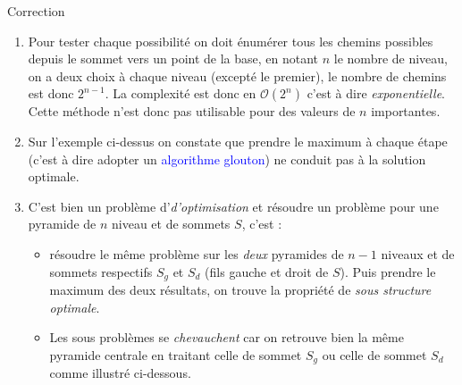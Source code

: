 \documentclass[10pt]{beamer}
\begin{document}
\begin{frame}{\Ctitle}{\stitle}
	\begin{exampleblock}{Correction}
		\addtocounter{enumi}{1}
		\begin{enumerate}
			\item<1->\textcolor{OliveGreen}{\small Pour tester chaque possibilité on doit énumérer tous les chemins possibles depuis le sommet vers un point de la base, en notant $n$ le nombre de niveau, on a deux choix à chaque niveau (excepté le premier), le nombre de chemins est donc $2^{n-1}$. La complexité est donc en $\mathcal{O}(2^n)$ c'est à dire \textit{exponentielle}. Cette méthode n'est donc pas utilisable pour des valeurs de $n$ importantes.}
			\item<2->\textcolor{OliveGreen}{\small Sur l'exemple ci-dessus on constate que prendre le maximum à chaque étape (c'est à dire adopter un \textcolor{blue}{algorithme glouton}) ne conduit pas à la solution optimale.}
			\item<3->\textcolor{OliveGreen}{\small C'est bien un problème d'\textit{d'optimisation} et résoudre un problème pour une pyramide de $n$ niveau et de sommets $S$, c'est :}
			\begin{itemize}
			\item \textcolor{OliveGreen}{\small résoudre le même problème sur  les \textit{deux} pyramides de $n-1$ niveaux et de sommets respectifs $S_g$ et $S_d$ (fils gauche et droit de $S$). Puis prendre le maximum des deux résultats, on trouve la propriété de \textit{sous structure optimale}.}
			\item \textcolor{OliveGreen}{\small Les sous problèmes se \textit{chevauchent} car on retrouve bien la même pyramide centrale en traitant celle de sommet $S_g$ ou celle de sommet $S_d$ comme illustré ci-dessous.}
			\end{itemize}
		\end{enumerate}
	\end{exampleblock}
\end{frame}
\end{document}
